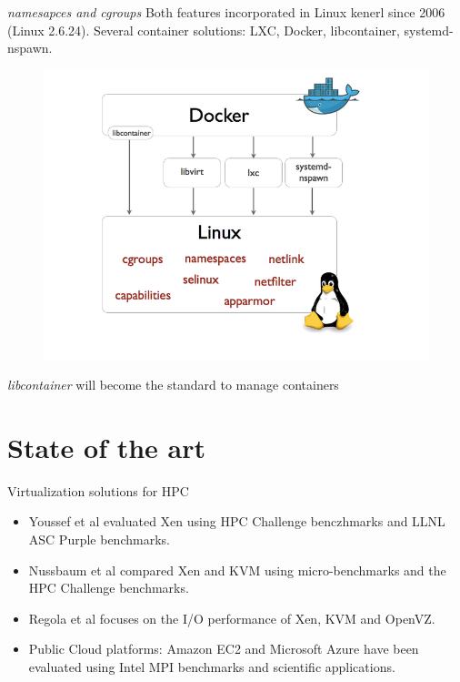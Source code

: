 \documentclass[presentation]{beamer}
\begin{document}
\begin{frame}[label=sec-1-4]{\emph{namesapces and cgroups}}
Both features incorporated in Linux kenerl since 2006 (Linux 2.6.24).
Several container solutions: LXC, Docker, libcontainer, systemd-nspawn.

\begin{figure}[!h]
  \center
  \includegraphics[scale=0.20]{figures/libcontainer-diagram.png}
  \label{fig:hpc}
\end{figure}

\emph{libcontainer} \alert{will become the standard to manage containers}
\end{frame}



\section{State of the art}
\label{sec-2}
\begin{frame}[label=sec-2-1]{Virtualization solutions for HPC}
\begin{itemize}
\item Youssef et al\cite{Youseff:2006:EPI:1308175.1308346} evaluated Xen using HPC
Challenge benczhmarks and LLNL ASC Purple benchmarks.

\item Nussbaum et al\cite{nussbaum2009linux} compared Xen and KVM using
micro-benchmarks and the HPC Challenge benchmarks.

\item Regola et al\cite{regola2010recommendations} focuses on the I/O
performance of Xen, KVM and OpenVZ.

\item Public Cloud platforms: Amazon EC2 \cite{5353067} and Microsoft Azure\cite{Tudoran:2012:PEA:2168697.2168701}
  have been evaluated using Intel MPI benchmarks and scientific applications.
\end{itemize}
\end{frame}
\end{document}
